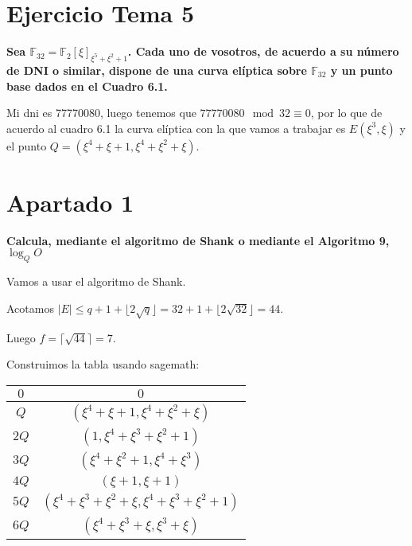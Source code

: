 \documentclass[a4paper]{article}
\title {\fbox{\Huge{\textbf{Ejercicio Tema 5}}}}
\author {\fbox{Ana Buendía Ruiz-Azuaga}}
\begin{document}
\maketitle


\section{Ejercicio Tema 5}

\textbf{Sea $\mathbb{F}_{32}=\mathbb{F}_{2}[\xi]_{\xi^5+\xi^2+1}$. Cada uno de vosotros, de acuerdo a su número de DNI o similar, dispone de una curva elíptica sobre $\mathbb{F}_{32}$ y un punto base dados en el Cuadro 6.1.}

Mi dni es 77770080, luego tenemos que $77770080 \mod 32 \equiv 0$, por lo que de acuerdo al cuadro 6.1 la curva elíptica con la que vamos a trabajar es $E(\xi^3, \xi)$ y el punto $Q=(\xi^4+\xi+1, \xi^4+\xi^2+\xi)$.

\section{Apartado 1}

\textbf{Calcula, mediante el algoritmo de Shank o mediante el Algoritmo 9, $\log_{Q}O$}

Vamos a usar el algoritmo de Shank.

Acotamos $|E| \leq q+1+\lfloor 2\sqrt{q}\rfloor = 32+1+\lfloor 2\sqrt{32}\rfloor = 44$.

Luego $f=\lceil \sqrt{44} \rceil = 7$.

Construimos la tabla usando sagemath:

\begin{table}[!h]
\begin{center}
\begin{tabular}{ |c|c| } 
 \hline
 $0$ & $0$  \\
 \hline
 $Q$ & $(\xi^4+\xi+1, \xi^4+\xi^2+\xi)$  \\
 \hline
 $2Q$ & $(1,\xi^4+\xi^3+\xi^2+1)$  \\ 
 \hline
 $3Q$ & $(\xi^4+\xi^2+1, \xi^4+\xi^3)$  \\ 
 \hline
 $4Q$ & $(\xi+1,\xi+1)$  \\ 
 \hline
 $5Q$ & $(\xi^4+\xi^3+\xi^2+\xi, \xi^4+\xi^3+\xi^2+1)$  \\ 
 \hline
 $6Q$ & $(\xi^4+\xi^3+\xi, \xi^3+\xi)$  \\ 
 \hline
\end{tabular}
\end{center}
\end{table}
\end{document}

